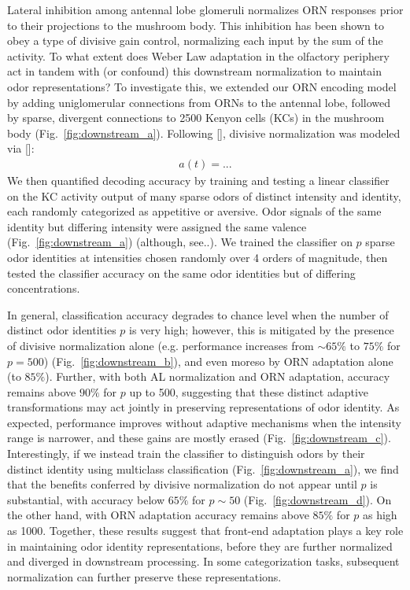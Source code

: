 Lateral inhibition among antennal lobe glomeruli normalizes ORN responses prior to their projections to the mushroom body. This inhibition has been shown to obey a type of divisive gain control, normalizing each input by the sum of the activity. To what extent does Weber Law adaptation in the olfactory periphery act in tandem with (or confound) this downstream normalization to maintain odor representations? To investigate this, we extended our ORN encoding model by adding uniglomerular connections from ORNs to the antennal lobe, followed by sparse, divergent connections to 2500 Kenyon cells (KCs) in the mushroom body (Fig.~\ref{fig:downstream_a}). Following [], divisive normalization  was modeled via  []:
\begin{align}
a(t) = ...
\end{align}
We then quantified decoding accuracy by training and testing a linear classifier on the KC activity output of  many sparse odors of distinct intensity and identity,  each randomly categorized as appetitive or aversive. Odor signals of the same identity but differing intensity were assigned the same valence (Fig.~\ref{fig:downstream_a}) (although, see..).  We trained the classifier on $p$ sparse odor identities at intensities chosen randomly over 4 orders of magnitude, then tested the classifier accuracy on the same odor identities but of differing concentrations. 

In general, classification accuracy degrades to chance level when the number of distinct odor identities $p$ is very high; however, this is mitigated by the presence of divisive normalization alone (e.g. performance increases from $\sim 65\%$ to $75\%$ for $p=500$) (Fig.~\ref{fig:downstream_b}), and even moreso by ORN adaptation alone (to $85\%$). Further, with both AL normalization and ORN adaptation, accuracy remains above $90\%$ for $p$ up to 500, suggesting that these distinct adaptive transformations may act jointly  in preserving representations of odor identity.  As expected, performance improves without adaptive mechanisms  when the intensity range is narrower, and these gains are mostly erased  (Fig.~\ref{fig:downstream_c}). Interestingly, if we instead train the classifier to distinguish odors by their distinct identity using multiclass classification (Fig.~\ref{fig:downstream_a}), we find that the benefits conferred by divisive normalization do not appear until $p$ is substantial, with accuracy below $65\%$ for $p \sim 50$ (Fig.~\ref{fig:downstream_d}). On the other hand, with ORN adaptation accuracy remains above $85\%$ for $p$ as high as 1000. Together, these results suggest that front-end adaptation plays a key role in maintaining odor identity representations, before they are further normalized and diverged in downstream processing. In some categorization tasks, subsequent normalization can further preserve these representations.



